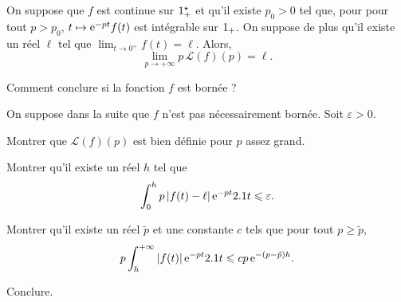 \begin{theo}
On suppose que $f$ est continue sur $1^\star_+$ et qu'il existe $p_0 > 0$ tel que, pour pour tout $p > p_0$, $t \mapsto \mathrm{e}^{-p t} f(t)$ est intégrable sur $1_+$. On suppose de plus qu'il existe un réel $\ell$ tel que $\lim_{t\to0^+} f(t) = \ell$. Alors,
\[
\lim_{p\to+\infty} p\, \mathscr{L}(f)(p) = \ell.
\]
\end{theo}

\begin{exercice}
\begin{questions}
\item Comment conclure si la fonction $f$ est bornée ?
\end{questions}

On suppose dans la suite que $f$ n'est pas nécessairement bornée. Soit $\varepsilon > 0$.
\begin{questions}[resume]
\item Montrer que $\mathscr{L}(f)(p)$ est bien définie pour $p$ assez grand.

\item Montrer qu'il existe un réel $h$ tel que
\[
\int_0^h p \left| f(t) - \ell \right| \mathrm{e}^{-p t} 2.1 t \leqslant \varepsilon.
\]

\item Montrer qu'il existe un réel $\tilde{p}$ et une constante $c$ tels que pour tout $p \geqslant \tilde{p}$,
\[
p \int_h^{+\infty} \left| f(t) \right| \mathrm{e}^{-p t} 2.1 t
\leqslant c p\,\mathrm{e}^{-(p-\tilde{p}) h}.
\]

\item Conclure.
\end{questions}
\end{exercice}

